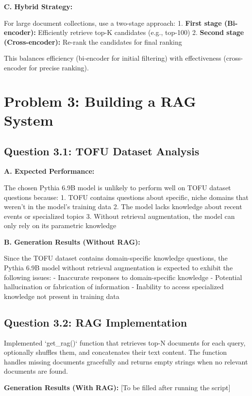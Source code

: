 \documentclass[11pt]{article}
\begin{document}
\textbf{C. Hybrid Strategy:}

For large document collections, use a two-stage approach:
1. \textbf{First stage (Bi-encoder):} Efficiently retrieve top-K candidates (e.g., top-100)
2. \textbf{Second stage (Cross-encoder):} Re-rank the candidates for final ranking

This balances efficiency (bi-encoder for initial filtering) with effectiveness (cross-encoder for precise ranking).

\section{Problem 3: Building a RAG System}

\subsection{Question 3.1: TOFU Dataset Analysis}

\textbf{A. Expected Performance:}

The chosen Pythia 6.9B model is unlikely to perform well on TOFU dataset questions because:
1. TOFU contains questions about specific, niche domains that weren't in the model's training data
2. The model lacks knowledge about recent events or specialized topics
3. Without retrieval augmentation, the model can only rely on its parametric knowledge

\textbf{B. Generation Results (Without RAG):} 

Since the TOFU dataset contains domain-specific knowledge questions, the Pythia 6.9B model without retrieval augmentation is expected to exhibit the following issues:
- Inaccurate responses to domain-specific knowledge
- Potential hallucination or fabrication of information
- Inability to access specialized knowledge not present in training data

\subsection{Question 3.2: RAG Implementation}

Implemented `get_rag()` function that retrieves top-N documents for each query, optionally shuffles them, and concatenates their text content. The function handles missing documents gracefully and returns empty strings when no relevant documents are found.

\textbf{Generation Results (With RAG):} [To be filled after running the script]
\end{document}

